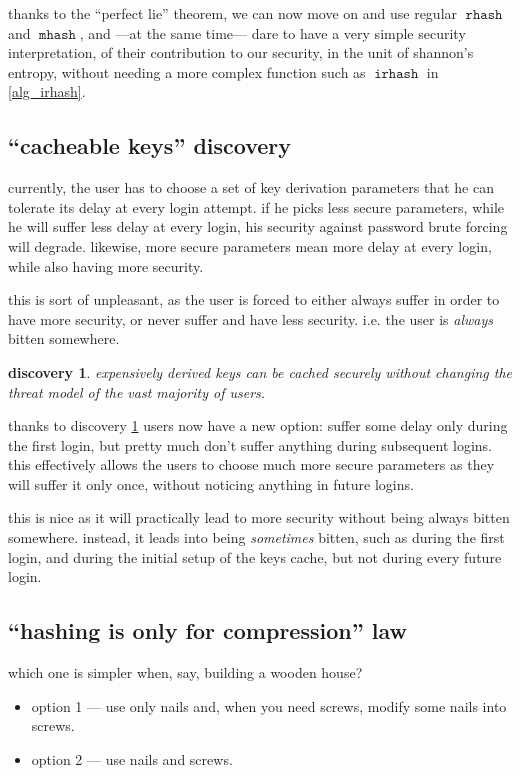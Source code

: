 \documentclass[twocolumn]{article}
\newtheorem{discovery}{discovery}[section]
\DeclareMathOperator{\rhash}{\mathtt{rhash}}
\DeclareMathOperator{\mhash}{\mathtt{mhash}}
\DeclareMathOperator{\irhash}{\mathtt{irhash}}
\begin{document}
thanks to the ``perfect lie'' theorem, we can now move on and use regular
$\rhash$ and $\mhash$, and ---at the same time--- dare to have a very
simple security interpretation, of their contribution to our security, in
the unit of shannon's entropy, without needing a more complex function such
as $\irhash$ in \cref{alg_irhash}.

\subsection{``cacheable keys'' discovery}
currently, the user has to choose a set of key derivation parameters that
he can tolerate its delay at every login attempt.  if he picks less secure
parameters, while he will suffer less delay at every login, his security
against password brute forcing will degrade.  likewise, more secure
parameters mean more delay at every login, while also having more security.

this is sort of unpleasant, as the user is forced to either always suffer
in order to have more security, or never suffer and have less security.
i.e. the user is \emph{always} bitten somewhere.

\begin{discovery}\label{discov_key_caching}
    expensively derived keys can be cached securely without changing the
    threat model of the vast majority of users.
\end{discovery}

thanks to discovery \ref{discov_key_caching} users now have a new option:
suffer some delay only during the first login, but pretty much don't suffer
anything during subsequent logins.  this effectively allows the users to
choose much more secure parameters as they will suffer it only once,
without noticing anything in future logins.

this is nice as it will practically lead to more security without being
{always} bitten somewhere.  instead, it leads into being \emph{sometimes}
bitten, such as during the first login, and during the initial setup of the
keys cache, but not during every future login.

\subsection{``hashing is only for compression'' law}
which one is simpler when, say, building a wooden house?
\begin{itemize}
    \item option 1 --- use only nails and, when you need screws,
    modify some nails into screws.
    \item option 2 --- use nails and screws.
\end{itemize}
\end{document}
